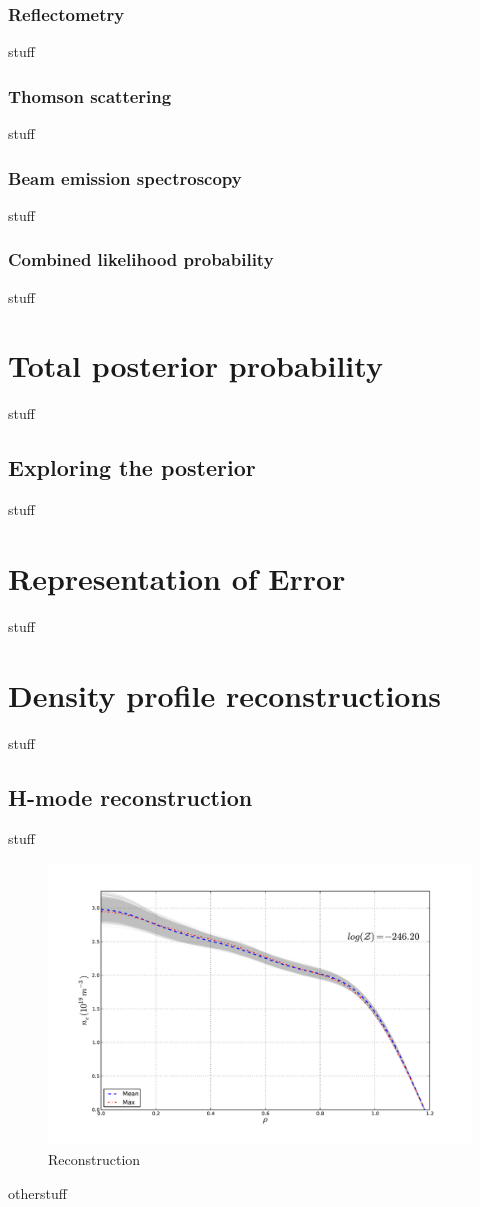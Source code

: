 \documentclass	[12pt]{article}
\begin{document}
\subsubsection{Reflectometry}
stuff
\subsubsection{Thomson scattering}
stuff
\subsubsection{Beam emission spectroscopy}
stuff
\subsubsection{Combined likelihood probability}
stuff
\section{Total posterior probability}
stuff
\subsection{Exploring the posterior}
stuff
\section{Representation of Error}
stuff
\section{Density profile reconstructions}
stuff
\subsection{H-mode reconstruction}
stuff
\begin{figure}[ht]
	\centering
	\includegraphics[width=12cm,keepaspectratio=true]{figures/bfit146102_00505_all5}
	\vspace{-30pt}
	\caption{Reconstruction}
\label{hi}
\end{figure}
otherstuff
\end{document}
